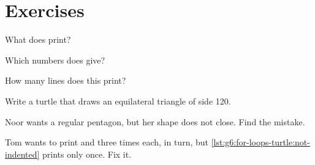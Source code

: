 \label{lst:g6:for-loops-turtle:stairs}

\label{out:g6:for-loops-turtle:stairs}

\section{Exercises}

\begin{exercise}[$\star$]\label{exo:g6:for-loops-turtle:1}
What does  print?
\end{exercise}

\begin{exercise}[$\star$]\label{exo:g6:for-loops-turtle:2}
Which numbers does  give?
\end{exercise}

\begin{exercise}[$\star$]\label{exo:g6:for-loops-turtle:3}
How many lines does this  print?

\label{lst:g6:for-loops-turtle:nested-count}
\end{exercise}

\begin{exercise}[$\star$]\label{exo:g6:for-loops-turtle:4}
Write a turtle  that draws an equilateral triangle of side 120.
\end{exercise}

\begin{exercise}[$\star\star$]\label{exo:g6:for-loops-turtle:5}
Noor wants a regular pentagon, but her shape does not close. Find the mistake.

\label{lst:g6:for-loops-turtle:open}
\end{exercise}

\begin{exercise}[$\star\star$]\label{exo:g6:for-loops-turtle:6}
Tom wants to print  and  three times each, in turn,
but \cref{lst:g6:for-loops-turtle:not-indented} prints  only
once. Fix it.
\end{exercise}

